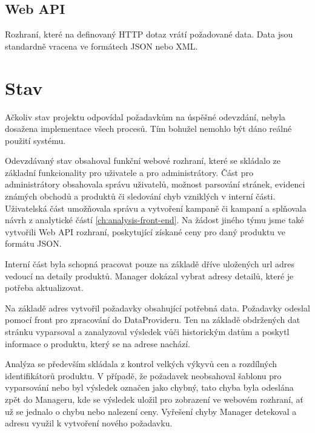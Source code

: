 \documentclass[thesis=B,czech]{FITthesis}[2012/06/26]
\begin{document}
\subsection{Web API}
Rozhraní, které na definovaný HTTP dotaz vrátí požadované data. Data jsou standardně vracena ve formátech JSON nebo XML.

\section{Stav}
Ačkoliv stav projektu odpovídal požadavkům na úspěšné odevzdání, nebyla dosažena implementace všech procesů. Tím bohužel nemohlo být dáno reálné použití systému.
\par
Odevzdávaný stav obsahoval funkční webové rozhraní, které se skládalo ze základní funkcionality pro uživatele a pro administrátory.
Část pro administrátory obsahovala správu uživatelů, možnost parsování stránek, evidenci známých obchodů a produktů či sledování
chyb vzniklých v interní části.
Uživatelská část umožňovala správu a vytvoření kampaně či kampaní a splňovala návrh z analytické částí \ref{ch:analysis-front-end}.
Na žádost jiného týmu jsme také vytvořili Web API rozhraní, poskytující získané ceny pro daný produktu ve formátu JSON.
\par
Interní část byla schopná pracovat pouze na základě dříve uložených url adres vedoucí na detaily produktů. 
Manager dokázal vybrat adresy detailů, které je potřeba aktualizovat.
\par
Na základě adres vytvořil požadavky obsahující potřebná data. Požadavky odeslal pomocí front pro zpracování do DataProvideru. Ten na základě obdržených dat stránku vyparsoval a zanalyzoval výsledek vůči historickým datům a poskytl informace o produktu, který se na adrese nachází.
\par
Analýza se především skládala z kontrol velkých výkyvů cen a rozdílných identifikátorů produktu.
V případě, že požadavek neobsahoval šablonu pro vyparsování nebo byl výsledek označen jako chybný, tato chyba byla odeslána zpět do Manageru, kde se  výsledek uložil pro zobrazení ve webovém rozhraní, ať už se jednalo o chybu
nebo nalezení ceny. Vyřešení chyby Manager detekoval a adresu využil k vytvoření nového požadavku.
\end{document}
